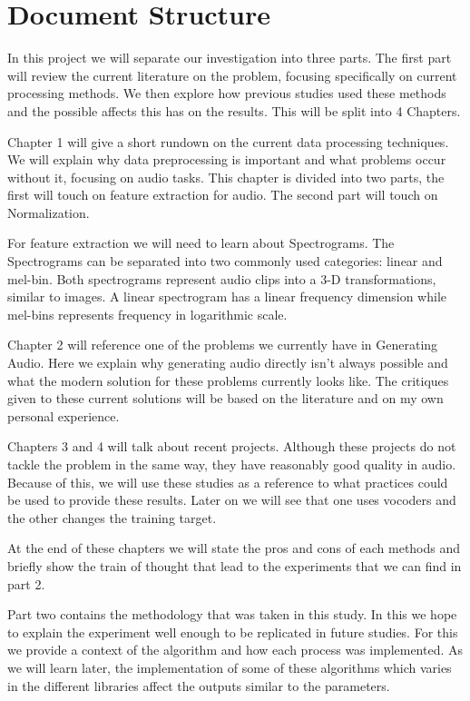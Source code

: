 \documentclass{book}
\begin{document}
\section{Document Structure}
\qquad In this project we will separate our investigation into three parts.
The first part will review the current literature on the problem, focusing specifically on current processing methods.
We then explore how previous studies used these methods and the possible affects this has on the results.
This will be split into 4 Chapters.
\par
Chapter 1 will give a short rundown on the current data processing techniques.
We will explain why data preprocessing is important and what problems occur without it, focusing on audio tasks.
This chapter is divided into two parts, the first will touch on feature extraction for audio.
The second part will touch on Normalization.
\par
For feature extraction we will need to learn about Spectrograms.
The Spectrograms can be separated into two commonly used categories: linear and mel-bin.
Both spectrograms represent audio clips into a 3-D transformations, similar to images.
A linear spectrogram has a linear frequency dimension while mel-bins represents frequency in logarithmic scale.
\par
Chapter 2 will reference one of the problems we currently have in Generating Audio.
Here we explain why generating audio directly isn't always possible and what the modern solution for these problems currently looks like.
The critiques given to these current solutions will be based on the literature and on my own personal experience.
\par
Chapters 3 and 4 will talk about recent projects.
Although these projects do not tackle the problem in the same way, they have reasonably good quality in audio.
Because of this, we will use these studies as a reference to what practices could be used to provide these results.
Later on we will see that one uses vocoders and the other changes the training target.
\par
At the end of these chapters we will state the pros and cons of each methods and briefly show the train of thought that lead to the experiments that we can find in part 2.
\par Part two contains the methodology that was taken in this study.
In this we hope to explain the experiment well enough to be replicated in future studies.
For this we provide a context of the algorithm and how each process was implemented.
As we will learn later, the implementation of some of these algorithms which varies in the different libraries affect the outputs similar to the parameters.
\end{document}
